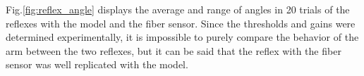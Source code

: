 Fig.\ref{fig:reflex_angle} displays the average and range of angles in 20 trials of the reflexes with the model and the fiber sensor. Since the thresholds and gains were determined experimentally, it is impossible to purely compare the behavior of the arm between the two reflexes, but it can be said that the reflex with the fiber sensor was well replicated with the model.



